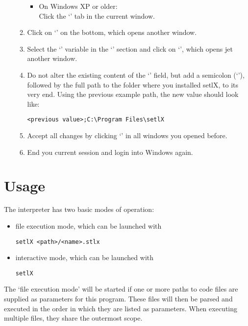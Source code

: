\begin{enumerate}
\begin{enumerate}
\begin{itemize}
			\item On Windows XP or older:\\Click the `' tab in the current window.
		\end{itemize}
		\item Click on `' on the bottom, which opens another window.
		\item Select the `' variable in the `' section and click on `', which opens jet another window.
		\item Do not alter the existing content of the `' field, but add a semicolon (`\command{;}'), followed by the full path to the folder where you installed setlX, to its very end. Using the previous example path, the new value should look like:
\begin{lstlisting}[frame=none,numbers=none]
<previous value>;C:\Program Files\setlX
\end{lstlisting}
		\item Accept all changes by clicking `' in all windows you opened before.
		\item End you current session and login into Windows again.
	\end{enumerate}
\end{enumerate}

\newpage

\section{Usage}

The \setlX{} interpreter has two basic modes of operation:

\begin{itemize}
	\item file execution mode, which can be launched with
\begin{lstlisting}[frame=none,numbers=none]
setlX <path>/<name>.stlx
\end{lstlisting}
	\item interactive mode, which can be launched with
\begin{lstlisting}[frame=none,numbers=none]
setlX
\end{lstlisting}
\end{itemize}

The `file execution mode' will be started if one or more paths to code files are supplied as parameters for this program. These files will then be parsed and executed in the order in which they are listed as parameters. When executing multiple files, they share the outermost scope.

